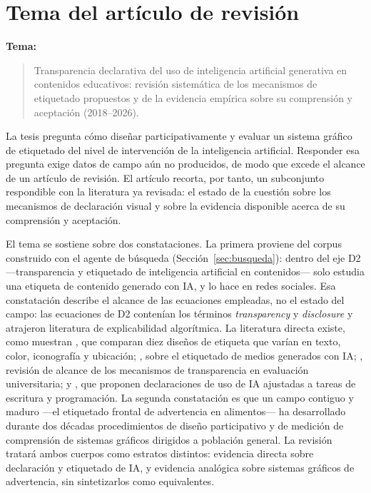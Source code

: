 \documentclass[letter,12pt]{article}
\begin{document}
\section{Tema del artículo de revisión}\label{sec:tema-articulo}

\noindent\textbf{Tema:}

\begin{quote}
Transparencia declarativa del uso de inteligencia artificial generativa en contenidos educativos: revisión sistemática de los mecanismos de etiquetado propuestos y de la evidencia empírica sobre su comprensión y aceptación (2018--2026).
\end{quote}

La tesis pregunta cómo diseñar participativamente y evaluar un sistema gráfico de etiquetado del nivel de intervención de la inteligencia artificial. Responder esa pregunta exige datos de campo aún no producidos, de modo que excede el alcance de un artículo de revisión. El artículo recorta, por tanto, un subconjunto respondible con la literatura ya revisada: el estado de la cuestión sobre los mecanismos de declaración visual y sobre la evidencia disponible acerca de su comprensión y aceptación.

El tema se sostiene sobre dos constataciones. La primera proviene del corpus construido con el agente de búsqueda (Sección~\ref{sec:busqueda}): dentro del eje D2 ---transparencia y etiquetado de inteligencia artificial en contenidos--- solo \citet{seeger2026} estudia una etiqueta de contenido generado con IA, y lo hace en redes sociales. Esa constatación describe el alcance de las ecuaciones empleadas, no el estado del campo: las ecuaciones de D2 contenían los términos \textit{transparency} y \textit{disclosure} y atrajeron literatura de explicabilidad algorítmica. La literatura directa existe, como muestran \citet{gamage2025}, que comparan diez diseños de etiqueta que varían en texto, color, iconografía y ubicación; \citet{wittenberg2025}, sobre el etiquetado de medios generados con IA; \citet{perezperez2026}, revisión de alcance de los mecanismos de transparencia en evaluación universitaria; y \citet{micallef2026}, que proponen declaraciones de uso de IA ajustadas a tareas de escritura y programación. La segunda constatación es que un campo contiguo y maduro ---el etiquetado frontal de advertencia en alimentos--- ha desarrollado durante dos décadas procedimientos de diseño participativo y de medición de comprensión de sistemas gráficos dirigidos a población general. La revisión tratará ambos cuerpos como estratos distintos: evidencia directa sobre declaración y etiquetado de IA, y evidencia analógica sobre sistemas gráficos de advertencia, sin sintetizarlos como equivalentes.
\end{document}

